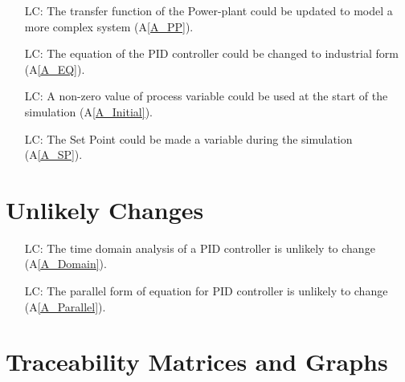\documentclass[12pt]{article}
\newcommand{\aref}[1]{A\ref{#1}}
\newcounter{lcnum} %
\begin{document}
\noindent \begin{itemize}

\item[LC\refstepcounter{lcnum}\thelcnum\label{LC_PP}:]  The transfer function of the Power-plant could be updated 
    to model a more complex system (\aref{A_PP}).
    
\item[LC\refstepcounter{lcnum}\thelcnum\label{LC_EQ}:] The equation of the 
    PID controller could be changed to industrial form (\aref{A_EQ}).
    
\item[LC\refstepcounter{lcnum}\thelcnum\label{LC_Initial}:] A non-zero value
    of process variable could be used at the start of the simulation 
    (\aref{A_Initial}).
    
\item[LC\refstepcounter{lcnum}\thelcnum\label{LC_SP}:] The Set Point could be 
    made a variable during the simulation (\aref{A_SP}).

\end{itemize}

\section{Unlikely Changes}    

\noindent \begin{itemize}

\item[LC\refstepcounter{lcnum}\thelcnum\label{LC_U_TD}:]  The time domain analysis of a PID controller is unlikely to 
    change (\aref{A_Domain}).
    
\item[LC\refstepcounter{lcnum}\thelcnum\label{LC_U_Parallel}:]  The parallel form of equation for PID controller is 
    unlikely to change (\aref{A_Parallel}).

\end{itemize}

\section{Traceability Matrices and Graphs}
\end{document}
